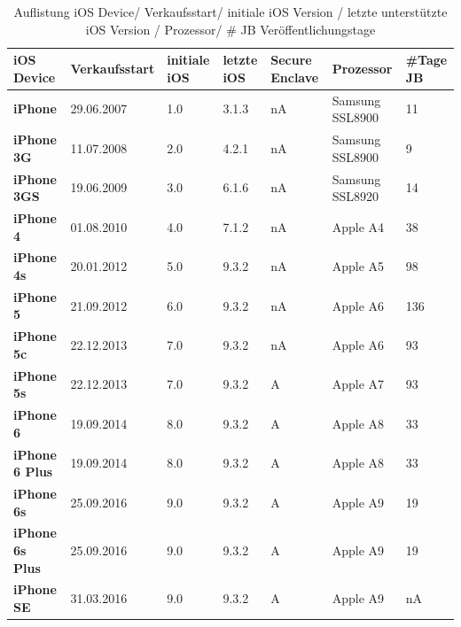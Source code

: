 \begin{table}[htp!]
    \begin{center}
        \begin{tabular}{|p{30mm}|p{27mm}|p{13mm}|p{10mm}|p{18mm}|p{2cm}|p{15mm}|} \hline
            \textbf{iOS Device} & \textbf{Verkaufsstart} & \textbf{initiale iOS} & \textbf{letzte iOS} & \textbf{Secure Enclave} & \textbf{Prozessor}  & \textbf{\#Tage JB} \\ \hline
            \textbf{iPhone} & 29.06.2007  & 1.0 & 3.1.3 & nA & Samsung SSL8900 & 11\\ \hline
            \textbf{iPhone 3G} & 11.07.2008 & 2.0 & 4.2.1 & nA & Samsung SSL8900 & 9\\ \hline
            \textbf{iPhone 3GS} & 19.06.2009 & 3.0 & 6.1.6 & nA & Samsung SSL8920 & 14\\ \hline
            \textbf{iPhone 4} & 01.08.2010 & 4.0 & 7.1.2 & nA & Apple A4 & 38 \\ \hline
            \textbf{iPhone 4s} & 20.01.2012 & 5.0 & 9.3.2 & nA & Apple A5 & 98 \\ \hline 
            \textbf{iPhone 5} & 21.09.2012 & 6.0 &  9.3.2 & nA & Apple A6 & 136 \\ \hline
            \textbf{iPhone 5c} & 22.12.2013 & 7.0 & 9.3.2 & nA & Apple A6 & 93 \\ \hline
            \textbf{iPhone 5s} & 22.12.2013 & 7.0 & 9.3.2 & A & Apple A7 & 93 \\ \hline
            \textbf{iPhone 6} & 19.09.2014 & 8.0 & 9.3.2 & A & Apple A8 & 33\\ \hline
            \textbf{iPhone 6 Plus} & 19.09.2014 & 8.0 & 9.3.2 &  A & Apple A8 & 33\\ \hline
            \textbf{iPhone 6s} & 25.09.2016 & 9.0 &  9.3.2 & A & Apple A9 & 19\\ \hline
            \textbf{iPhone 6s Plus} & 25.09.2016 & 9.0 & 9.3.2 &  A & Apple A9 & 19\\ \hline
            \textbf{iPhone SE} & 31.03.2016 & 9.0 &  9.3.2 & A & Apple A9 & nA\\ \hline  
        \end{tabular} 
        \caption{Auflistung iOS Device/ Verkaufsstart/ initiale iOS Version / letzte unterstützte iOS Version / Prozessor/ \# JB Veröffentlichungstage \protect\footnotemark}
        \label{tab:iOSHW}
    \end{center}
\end{table}

